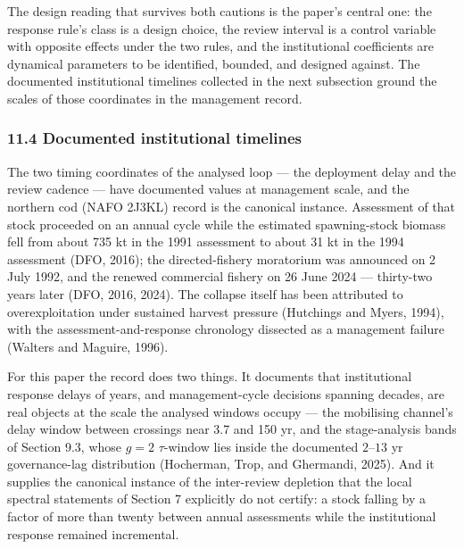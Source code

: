 \documentclass[11pt]{article}
\begin{document}
The design reading that survives both cautions is the paper's central
one: the response rule's class is a design choice, the review interval
is a control variable with opposite effects under the two rules, and the
institutional coefficients are dynamical parameters to be identified,
bounded, and designed against. The documented institutional timelines
collected in the next subsection ground the scales of those coordinates
in the management record.

\subsubsection{11.4 Documented institutional
timelines}\label{documented-institutional-timelines}

The two timing coordinates of the analysed loop --- the deployment delay
and the review cadence --- have documented values at management scale,
and the northern cod (NAFO 2J3KL) record is the canonical instance.
Assessment of that stock proceeded on an annual cycle while the
estimated spawning-stock biomass fell from about 735 kt in the 1991
assessment to about 31 kt in the 1994 assessment (DFO, 2016); the
directed-fishery moratorium was announced on 2 July 1992, and the
renewed commercial fishery on 26 June 2024 --- thirty-two years later
(DFO, 2016, 2024). The collapse itself has been attributed to
overexploitation under sustained harvest pressure (Hutchings and Myers,
1994), with the assessment-and-response chronology dissected as a
management failure (Walters and Maguire, 1996).

For this paper the record does two things. It documents that
institutional response delays of years, and management-cycle decisions
spanning decades, are real objects at the scale the analysed windows
occupy --- the mobilising channel's delay window between crossings near
3.7 and 150 yr, and the stage-analysis bands of Section 9.3, whose
\(g=2\) \(\tau\)-window lies inside the documented \(2\)--\(13\) yr
governance-lag distribution (Hocherman, Trop, and Ghermandi, 2025). And
it supplies the canonical instance of the inter-review depletion that
the local spectral statements of Section 7 explicitly do not certify: a
stock falling by a factor of more than twenty between annual assessments
while the institutional response remained incremental.
\end{document}
